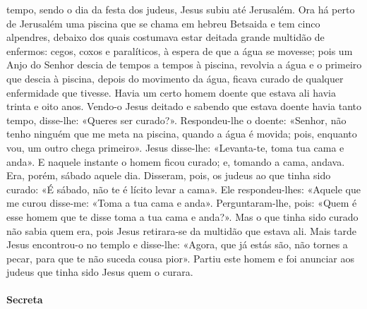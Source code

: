 \begin{paracol}{2}
{ tempo, sendo o dia da festa dos judeus, Jesus subiu até Jerusalém. Ora há perto de Jerusalém uma piscina que se chama em hebreu Betsaida e tem cinco alpendres, debaixo dos quais costumava estar deitada grande multidão de enfermos: cegos, coxos e paralíticos, à espera de que a água se movesse; pois um Anjo do Senhor descia de tempos a tempos à piscina, revolvia a água e o primeiro que descia à piscina, depois do movimento da água, ficava curado de qualquer enfermidade que tivesse. Havia um certo homem doente que estava ali havia trinta e oito anos. Vendo-o Jesus deitado e sabendo que estava doente havia tanto tempo, disse-lhe: «Queres ser curado?». Respondeu-lhe o doente: «Senhor, não tenho ninguém que me meta na piscina, quando a água é movida; pois, enquanto vou, um outro chega primeiro». Jesus disse-lhe: «Levanta-te, toma tua cama e anda». E naquele instante o homem ficou curado; e, tomando a cama, andava. Era, porém, sábado aquele dia. Disseram, pois, os judeus ao que tinha sido curado: «É sábado, não te é lícito levar a cama». Ele respondeu-lhes: «Aquele que me curou disse-me: «Toma a tua cama e anda». Perguntaram-lhe, pois: «Quem é esse homem que te disse toma a tua cama e anda?». Mas o que tinha sido curado não sabia quem era, pois Jesus retirara-se da multidão que estava ali. Mais tarde Jesus encontrou-o no templo e disse-lhe: «Agora, que já estás são, não tornes a pecar, para que te não suceda cousa pior». Partiu este homem e foi anunciar aos judeus que tinha sido Jesus quem o curara.
}\end{paracol}

\begin{paracol}{2}\switchcolumn{}\end{paracol}

\paragraph{Secreta}
\begin{paracol}{2}\switchcolumn{}\end{paracol}

